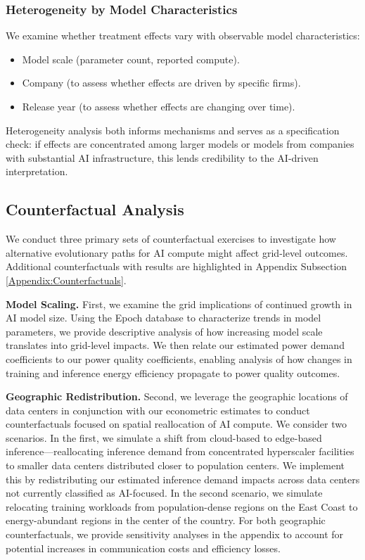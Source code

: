 \documentclass[a4paper,fleqn,longmktitle]{cas-sc}
\begin{document}
\subsubsection{Heterogeneity by Model Characteristics}

We examine whether treatment effects vary with observable model characteristics:
\begin{itemize}
    \item Model scale (parameter count, reported compute).
    \item Company (to assess whether effects are driven by specific firms).
    \item Release year (to assess whether effects are changing over time).
\end{itemize}
Heterogeneity analysis both informs mechanisms and serves as a specification check: if effects are concentrated among larger models or models from companies with substantial AI infrastructure, this lends credibility to the AI-driven interpretation.
\subsection{Counterfactual Analysis}\label{counterfactuals}%

We conduct three primary sets of counterfactual exercises to investigate how alternative evolutionary paths for AI compute might affect grid-level outcomes. Additional counterfactuals with results are highlighted in Appendix Subsection \ref{Appendix:Counterfactuals}.

\textbf{Model Scaling.} First, we examine the grid implications of continued growth in AI model size. Using the Epoch database to characterize trends in model parameters, we provide descriptive analysis of how increasing model scale translates into grid-level impacts. We then relate our estimated power demand coefficients to our power quality coefficients, enabling analysis of how changes in training and inference energy efficiency propagate to power quality outcomes.

\textbf{Geographic Redistribution.} Second, we leverage the geographic locations of data centers in conjunction with our econometric estimates to conduct counterfactuals focused on spatial reallocation of AI compute. We consider two scenarios. In the first, we simulate a shift from cloud-based to edge-based inference—reallocating inference demand from concentrated hyperscaler facilities to smaller data centers distributed closer to population centers. We implement this by redistributing our estimated inference demand impacts across data centers not currently classified as AI-focused. In the second scenario, we simulate relocating training workloads from population-dense regions on the East Coast to energy-abundant regions in the center of the country. For both geographic counterfactuals, we provide sensitivity analyses in the appendix to account for potential increases in communication costs and efficiency losses.
\end{document}
